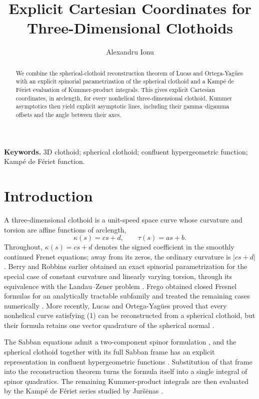 \documentclass[11pt]{article}
\title{\vspace{-12mm}\textbf{Explicit Cartesian Coordinates for Three-Dimensional Clothoids}}
\author{Alexandru Ionu\textcommabelow{t}}
\date{}
\begin{document}
\maketitle
\vspace{-6mm}
\begin{abstract}
We combine the spherical-clothoid reconstruction theorem of Lucas and Ortega-Yag\"ues with an explicit spinorial parametrization of the spherical clothoid and a Kamp\'e de F\'eriet evaluation of Kummer-product integrals. This gives explicit Cartesian coordinates, in arclength, for every nonhelical three-dimensional clothoid. Kummer asymptotics then yield explicit asymptotic lines, including their gamma--digamma offsets and the angle between their axes.
\end{abstract}
\noindent\textbf{Keywords.} 3D clothoid; spherical clothoid; confluent hypergeometric function; Kamp\'e de F\'eriet function.

\section{Introduction}
A three-dimensional clothoid is a unit-speed space curve whose curvature and torsion are affine functions of arclength,
\begin{equation}
\kappa(s)=cs+d,\qquad \tau(s)=as+b. \tag{1}
\end{equation}
Throughout, \(\kappa(s)=cs+d\) denotes the signed coefficient in the smoothly continued Frenet equations; away from its zeros, the ordinary curvature is \(|cs+d|\).
Berry and Robbins earlier obtained an exact spinorial parametrization for the special case of constant curvature and linearly varying torsion, through its equivalence with the Landau--Zener problem \cite{BerryRobbins1993}.
Frego obtained closed Fresnel formulas for an analytically tractable subfamily and treated the remaining cases numerically \cite{Frego2022}. More recently, Lucas and Ortega-Yag\"ues proved that every nonhelical curve satisfying (1) can be reconstructed from a spherical clothoid, but their formula retains one vector quadrature of the spherical normal \cite[Theorem~4.4]{LucasOrtega2026}.

The Sabban equations admit a two-component spinor formulation \cite{Senyurt2015}, and the spherical clothoid together with its full Sabban frame has an explicit representation in confluent hypergeometric functions \cite{Ionut2022}. Substitution of that frame into the reconstruction theorem turns the formula itself into a single integral of spinor quadratics. The remaining Kummer-product integrals are then evaluated by the Kamp\'e de F\'eriet series studied by Jur\v{s}\.{e}nas \cite{Jursenas2014}.
\end{document}

